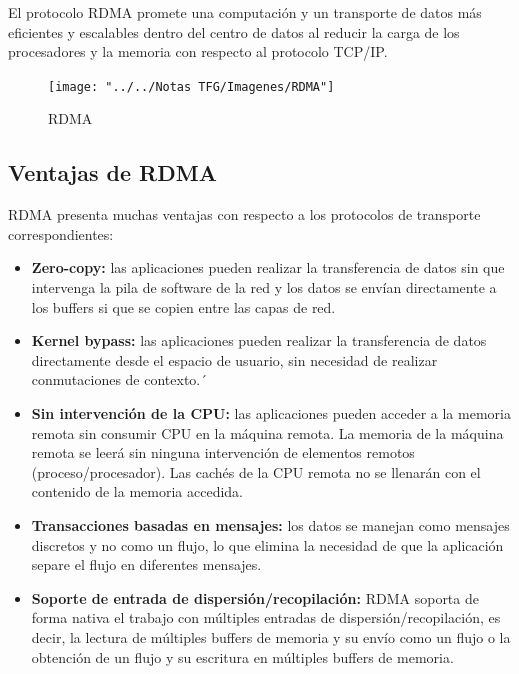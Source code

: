 El protocolo RDMA promete una computación y un transporte de datos más eficientes y escalables dentro del centro de datos al reducir la carga de los procesadores y la memoria con respecto al protocolo TCP/IP. 

\begin{figure}[H]
	\centering
	\texttt{[image: "../../Notas TFG/Imagenes/RDMA"]}
	\caption{RDMA}
	\label{fig:rdma}
\end{figure}

\subsection{Ventajas de RDMA}
RDMA presenta muchas ventajas con respecto a los protocolos de transporte correspondientes:
\begin{itemize}
	\item \textbf{Zero-copy:} las aplicaciones pueden realizar la transferencia de datos sin que intervenga la pila de software de la red y los datos se envían directamente a los buffers si que se copien entre las capas de red.
	\item \textbf{Kernel bypass:} las aplicaciones pueden realizar la transferencia de datos directamente desde el espacio de usuario, sin necesidad de realizar conmutaciones de contexto.´
	\item \textbf{Sin intervención de la CPU:} las aplicaciones pueden acceder a la memoria remota sin consumir CPU en la máquina remota. La memoria de la máquina remota se leerá sin ninguna intervención de elementos remotos (proceso/procesador). Las cachés de la CPU remota no se llenarán con el contenido de la memoria accedida.
	\item \textbf{Transacciones basadas en mensajes:} los datos se manejan como mensajes discretos y no como un flujo, lo que elimina la necesidad de que la aplicación separe el flujo en diferentes mensajes.
	\item \textbf{Soporte de entrada de dispersión/recopilación:} RDMA soporta de forma nativa el trabajo con múltiples entradas de dispersión/recopilación, es decir, la lectura de múltiples buffers de memoria y su envío como un flujo o la obtención de un flujo y su escritura en múltiples buffers de memoria.
\end{itemize}

